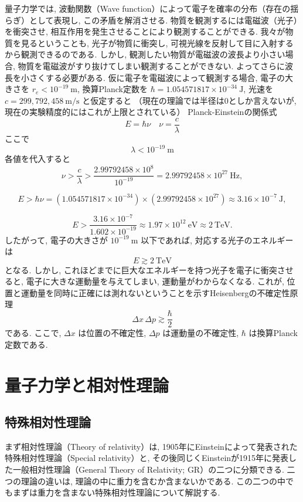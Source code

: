 \documentclass{ltjsarticle}
\begin{document}
量子力学では, 波動関数（Wave function）によって電子を確率の分布（存在の揺らぎ）として表現し, この矛盾を解消させる. 
物質を観測するには電磁波（光子）を衝突させ, 相互作用を発生させることにより観測することができる. 
我々が物質を見るということも, 光子が物質に衝突し, 可視光線を反射して目に入射するから観測できるのである. 
しかし, 観測したい物質が電磁波の波長より小さい場合, 物質を電磁波がすり抜けてしまい観測することができない. 
よってさらに波長を小さくする必要がある. 
仮に電子を電磁波によって観測する場合, 
電子の大きさを
$r_e<10^{-19}~\mathrm{m}$, 
換算Planck定数を
$\hbar = 1.054571817×10^{−34}~\mathrm{J}$, 
光速を
$c=299,792,458~\mathrm{m/s}$
と仮定すると
（現在の理論では半径は0としか言えないが, 現在の実験精度的にはこれが上限とされている）
Planck-Einsteinの関係式
\[
E = \hbar\nu \quad \nu = \frac{c}{\lambda}
\]
ここで
\[
\lambda < 10^{-19}~\mathrm{m}
\]
各値を代入すると
\[
\nu > \frac{c}{\lambda} > \frac{2.99792458 \times 10^8}{10^{-19}} = 2.99792458 \times 10^{27}~\mathrm{Hz},
\]

\[
E > \hbar \nu = (1.054571817 \times 10^{-34}) \times (2.99792458 \times 10^{27}) \approx 3.16 \times 10^{-7}~\mathrm{J},
\]

\[
E > \frac{3.16 \times 10^{-7}}{1.602 \times 10^{-19}} \approx 1.97 \times 10^{12}~\mathrm{eV} \approx 2~\mathrm{TeV}.
\]
したがって, 電子の大きさが $10^{-19}~\mathrm{m}$ 以下であれば, 対応する光子のエネルギーは
\[
E \gtrsim 2~\mathrm{TeV}
\]
となる. 
しかし, これほどまでに巨大なエネルギーを持つ光子を電子に衝突させると, 電子に大きな運動量を与えてしまい, 運動量がわからなくなる. 
これが, 位置と運動量を同時に正確には測れないということを示すHeisenbergの不確定性原理
\[
\Delta x \, \Delta p \gtrsim \frac{\hbar}{2}
\]
である. 
ここで, $\Delta x$ は位置の不確定性, $\Delta p$ は運動量の不確定性, $\hbar$ は換算Planck定数である. 

\section{量子力学と相対性理論}
\subsection{特殊相対性理論}
まず相対性理論（Theory of relativity）は, 1905年にEinsteinによって発表された特殊相対性理論（Special relativity）と, 
その後同じくEinsteinが1915年に発表した一般相対性理論（General Theory of Relativity; GR）の二つに分類できる. 
二つの理論の違いは, 理論の中に重力を含むか含まないかである. 
この二つの中でもまずは重力を含まない特殊相対性理論について解説する. 
\end{document}
